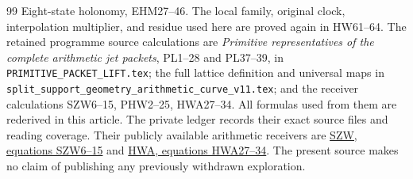 \documentclass[11pt]{article}
\begin{document}
\begin{thebibliography}{99}
{Eight-state holonomy, EHM27--46}.
The local family, original clock, interpolation multiplier,
and residue used here are proved again in HW61--64.
The retained programme source calculations are
\emph{Primitive representatives of the complete arithmetic jet packets},
PL1--28 and PL37--39, in
\texttt{PRIMITIVE\_PACKET\_LIFT.tex};
the full lattice definition and universal maps in
\texttt{split\_support\_geometry\_arithmetic\_curve\_v11.tex};
and the receiver calculations SZW6--15,
PHW2--25, HWA27--34.
All formulas used from them are rederived in this article.
The private ledger records their exact source files and reading
coverage. Their publicly available arithmetic receivers are
\href{https://github.com/KokunoYumeto/zeta-function-research-reader/blob/adfbfe74fa49e31cb7aa068cf755fb083be37c32/workbenches/splitzero-tandem/branches/tau-zero-prime-positivity/SUPPORTED_ZERO_PRIME_WEIL_DERIVATION.md}
{SZW, equations SZW6--15}
and
\href{https://github.com/KokunoYumeto/zeta-function-research-reader/blob/d5c9d198a8432e3ede468b280162a99c00e3f4f7/workbenches/splitzero-tandem/branches/tau-zero-prime-positivity/HOLONOMY_AVERAGING_WEIL_ENDPOINT_DERIVATION.md}
{HWA, equations HWA27--34}.
The present source makes no claim of publishing any previously
withdrawn exploration.
\end{thebibliography}
\end{document}
